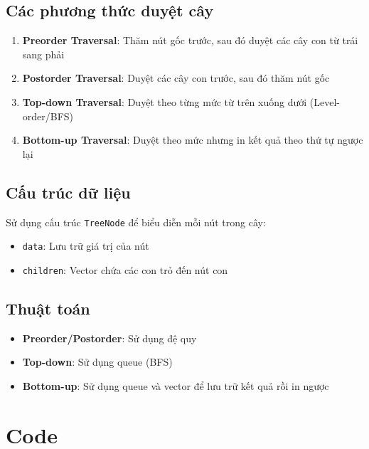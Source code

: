 \documentclass[12pt]{article}
\begin{document}
\subsection{Các phương thức duyệt cây}
\begin{enumerate}[label=(\alph*)]
\item \textbf{Preorder Traversal}: Thăm nút gốc trước, sau đó duyệt các cây con từ trái sang phải
\item \textbf{Postorder Traversal}: Duyệt các cây con trước, sau đó thăm nút gốc
\item \textbf{Top-down Traversal}: Duyệt theo từng mức từ trên xuống dưới (Level-order/BFS)
\item \textbf{Bottom-up Traversal}: Duyệt theo mức nhưng in kết quả theo thứ tự ngược lại
\end{enumerate}
\subsection{Cấu trúc dữ liệu}
Sử dụng cấu trúc \texttt{TreeNode} để biểu diễn mỗi nút trong cây:
\begin{itemize}
\item \texttt{data}: Lưu trữ giá trị của nút
\item \texttt{children}: Vector chứa các con trỏ đến nút con
\end{itemize}
\subsection{Thuật toán}
\begin{itemize}
\item \textbf{Preorder/Postorder}: Sử dụng đệ quy
\item \textbf{Top-down}: Sử dụng queue (BFS)
\item \textbf{Bottom-up}: Sử dụng queue và vector để lưu trữ kết quả rồi in ngược
\end{itemize}
\section{Code}
\end{document}
